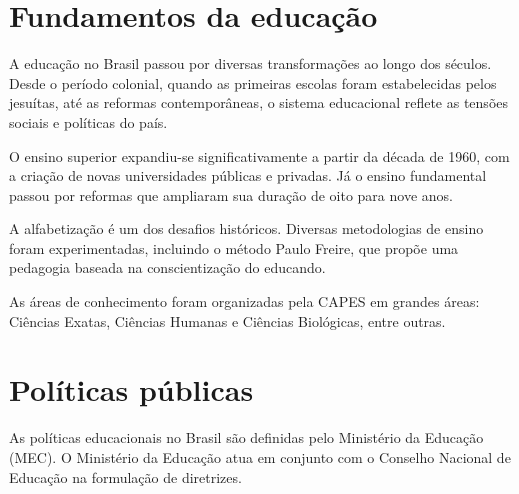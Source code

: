 \documentclass[a4paper, 12pt]{report}
\begin{document}
\chapter{Fundamentos da educação}

A educação no Brasil passou por diversas transformações ao longo
dos séculos. Desde o período colonial, quando as primeiras escolas
foram estabelecidas pelos jesuítas, até as reformas contemporâneas, o sistema
educacional reflete as tensões sociais e políticas do país.

O ensino superior expandiu-se significativamente
a partir da década de 1960, com a criação de novas universidades
públicas e privadas. Já o ensino fundamental
passou por reformas que ampliaram sua duração de oito para nove anos.

A alfabetização é um dos desafios históricos. Diversas
metodologias de ensino foram experimentadas, incluindo o método
Paulo Freire, que propõe uma pedagogia baseada
na conscientização do educando.

As áreas de conhecimento foram organizadas pela CAPES em
grandes áreas: Ciências Exatas,
Ciências Humanas e
Ciências Biológicas, entre outras.

\chapter{Políticas públicas}

As políticas educacionais no Brasil são definidas pelo
Ministério da Educação (MEC). O
Ministério da Educação atua em conjunto com o Conselho
Nacional de Educação na formulação de diretrizes.
\end{document}
